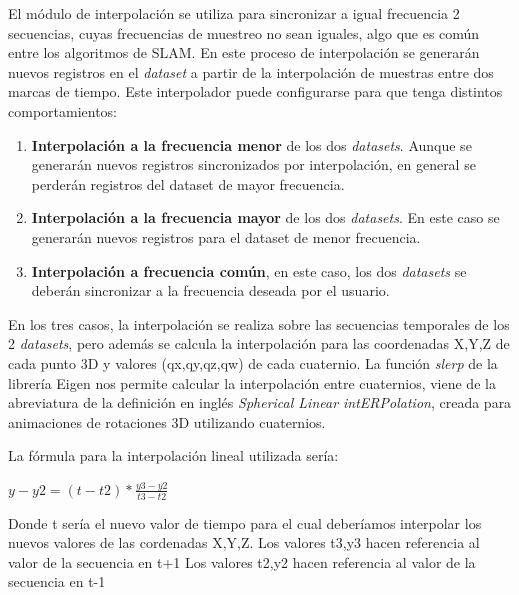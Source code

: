 	El módulo de interpolación se utiliza para sincronizar a igual frecuencia 2 secuencias, cuyas frecuencias de muestreo no sean iguales, algo que es común entre los algoritmos de SLAM.
	En este proceso de interpolación se generarán nuevos registros en el \textit{dataset} a partir de la interpolación de muestras entre dos marcas de tiempo.
	Este interpolador puede configurarse para que tenga distintos comportamientos:
    \begin{enumerate}
	 
	 \item{\textbf{Interpolación a la frecuencia menor}} de los dos \textit{datasets}. Aunque se generarán nuevos registros sincronizados por interpolación, en general se perderán registros del dataset de mayor frecuencia.

	 \item{\textbf{Interpolación a la frecuencia mayor}} de los dos \textit{datasets}. En este caso se generarán nuevos registros para el dataset de menor frecuencia.

	 \item{\textbf{Interpolación a frecuencia común}}, en este caso, los dos \textit{datasets} se deberán sincronizar a la frecuencia deseada por el usuario.
	 \end{enumerate}

	 En los tres casos, la interpolación se realiza sobre las secuencias temporales de los 2 \textit{datasets}, pero además se calcula la interpolación para las coordenadas X,Y,Z de cada punto 3D y valores (qx,qy,qz,qw) de cada cuaternio. La función \textit{slerp} de la librería Eigen nos permite calcular la interpolación entre cuaternios, viene de la abreviatura de la definición en inglés \textit{Spherical Linear intERPolation}, creada para animaciones de rotaciones 3D utilizando cuaternios.


	 La fórmula para la interpolación lineal utilizada sería:

	 \begin{center}
	 \begin{math}
		y-y2= (t-t2)*\frac{y3-y2}{t3-t2}
	 \end{math}
	 \end{center}

	 Donde t sería el nuevo valor de tiempo para el cual deberíamos interpolar los nuevos valores de las cordenadas X,Y,Z. 
	 Los valores t3,y3 hacen referencia al valor de la secuencia en t+1
	 Los valores t2,y2 hacen referencia al valor de la secuencia en t-1

	 



